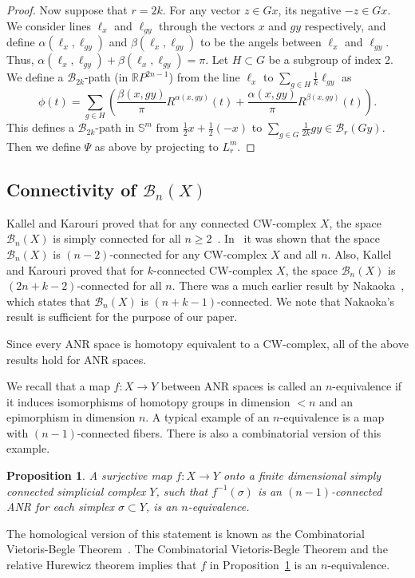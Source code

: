 \documentclass{amsart}
\numberwithin{equation}{section}
\theoremstyle{plain}
\newtheorem{prop}[thm]{Proposition}
\theoremstyle{definition}
\begin{document}
\begin{proof}
Now suppose that $r=2k$.  For any vector $z\in Gx$, its negative $-z\in Gx$. We  consider lines $\ell_x$ and $\ell_{gy}$ through the vectors $x$ and $gy$ respectively, and define $\alpha(\ell_x,\ell_{gy})$ and $\beta(\ell_x,\ell_{gy})$ to be the angels between $\ell_x$ and $\ell_{gy}$. Thus,
$\alpha(\ell_x,\ell_{gy})+\beta(\ell_x,\ell_{gy})=\pi.$ Let $H\subset G$ be a subgroup of index 2. We define a $\mathcal B_{2k}$-path (in $\mathbb RP^{2n-1}$) from the line $\ell_x$ to $\sum_{g\in H}\frac{1}{k}\ell_{gy}$ as
$$
\phi(t)=\sum_{g\in H}\left(\frac{\beta(x,gy)}{\pi}R^{\alpha
(x,gy)}(t)+\frac{\alpha(x,gy)}{\pi}R^{\beta(x,gy)}(t)\right).
$$
This defines a $\mathcal B_{2k}$-path in $\mathbb S^m$ from $\frac{1}{2}x+\frac{1}{2}(-x)$ to $\sum_{g\in G}\frac{1}{2k}gy\in\mathcal B_r(Gy)$.
Then we define $\Psi$ as above by projecting to $L_r^m$.
\end{proof}




\subsection{Connectivity of $\mathcal B_n(X)$}
Kallel and Karouri proved that for any connected CW-complex $X$,  the space
$\mathcal{B}_n(X)$ is simply connected for all $n\ge 2$~\cite{KK}.  In~\cite{Dr2} it was shown that  the space
$\mathcal{B}_n(X)$ is  $(n-2)$-connected for any CW-complex $X$ and all $n$.
Also, Kallel and Karouri proved that for $k$-connected  CW-complex $X$, the space
$\mathcal{B}_n(X)$ is $(2n+k-2)$-connected for all $n$. There was a much earlier  result by Nakaoka~\cite{Na}, 
which states that $\mathcal{B}_n(X)$ is $(n+k-1)$-connected. We note that Nakaoka's result is sufficient for the purpose of our paper. 

 
Since every ANR space is homotopy equivalent to a CW-complex, all of the above results hold for ANR spaces.

We recall that a map $f:X\to Y$ between ANR spaces is called an $n$-equivalence if it induces isomorphisms of homotopy groups in dimension $<n$ and an epimorphism in dimension $n$.
A typical example of an $n$-equivalence is a map with $(n-1)$-connected fibers. There is also a combinatorial version of this example.
\begin{prop}\label{V-B}
 A surjective map $f:X\to Y$ onto a finite dimensional simply connected simplicial complex $Y$,  such that $f^{-1}(\sigma)$ is an $(n-1)$-connected ANR for each simplex $\sigma\subset Y$, is an $n$-equivalence.
\end{prop}
The homological version of this statement is known as the Combinatorial Vietoris-Begle Theorem~\cite{Dr2}.
The Combinatorial Vietoris-Begle Theorem and the relative Hurewicz theorem implies that $f$ in Proposition~\ref{V-B} is an $n$-equivalence.
\end{document}
